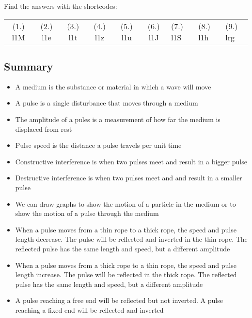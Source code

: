 \par 
  \label{m38802*eip-812}
\par {} Find the answers with the shortcodes:
 \par \begin{tabular}[h]{cccccc}
 (1.) l1M  &  (2.) l1e  &  (3.) l1t  &  (4.) l1z  &  (5.) l1u  &  (6.) l1J  &  (7.) l1S  &  (8.) l1h  &  (9.) lrg  & \end{tabular}
            \subsection{ Summary}
            \nopagebreak
            \label{m38802*eip-404}\begin{itemize}[noitemsep]
            \item A medium is the substance or material in which a wave will move\item A pulse is a single disturbance that moves through a medium\item The amplitude of a pules is a measurement of how far the medium is displaced from rest\item Pulse speed is the distance a pulse travels per unit time\item Constructive interference is when two pulses meet and result in a bigger pulse\item Destructive interference is when two pulses meet and and result in a smaller pulse\item We can draw graphs to show the motion of a particle in the medium or to show the motion of a pulse through the medium\item When a pulse moves from a thin rope to a thick rope, the speed and pulse length decrease. The pulse will be reflected and inverted in the thin rope. The reflected pulse has the same length and speed, but a different amplitude\item When a pulse moves from a thick rope to a thin rope, the speed and pulse length increase. The pulse will be reflected in the thick rope. The reflected pulse has the same length and speed, but a different amplitude\item A pulse reaching a free end will be reflected but not inverted. A pulse reaching a fixed end will be reflected and inverted\end{itemize}
        \label{m38802*cid9}
